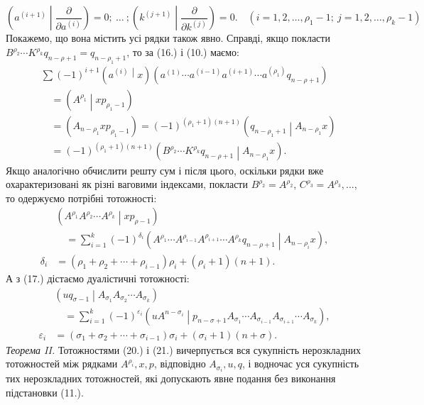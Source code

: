 \documentclass[11pt]{article}
\newcommand{\pair}[2]{\left(#1\middle|#2\right)}
\newcommand{\eps}{\varepsilon}
\begin{document}
\begin{equation}
 \left(a^{(i+1)}\middle|\frac{\partial}{\partial a^{(i)}}\right)=0;\ \ldots\ ;
 \left(k^{(j+1)}\middle|\frac{\partial}{\partial k^{(j)}}\right)=0.
 \quad (i=1,2,\ldots,\rho_1-1;\ j=1,2,\ldots,\rho_k-1)
\tag{19}
\end{equation}
Покажемо, що вона містить усі рядки також явно. Справді, якщо покласти $B^{\rho_2}\cdots K^{\rho_k}q_{n-\rho+1}=q_{n-\rho_1+1}$, то за (16.) і (10.) маємо:
\[
\begin{aligned}
&\sum(-1)^{i+1}\pair{a^{(i)}}{x}
(a^{(1)}\cdots a^{(i-1)}a^{(i+1)}\cdots a^{(\rho_1)}q_{n-\rho+1})\\
&\quad=\pair{A^{\rho_1}}{xp_{\rho_1-1}}\\
&\quad=(A_{n-\rho_1}xp_{\rho_1-1})
=(-1)^{(\rho_1+1)(n+1)}\pair{q_{n-\rho_1+1}}{A_{n-\rho_1}x}\\
&\quad=(-1)^{(\rho_1+1)(n+1)}
\pair{B^{\rho_2}\cdots K^{\rho_k}q_{n-\rho+1}}{A_{n-\rho_1}x}.
\end{aligned}
\]
Якщо аналогічно обчислити решту сум і після цього, оскільки рядки вже охарактеризовані як різні ваговими індексами, покласти $B^{\rho_2}=A^{\rho_2}$, $C^{\rho_3}=A^{\rho_3},\ldots$, то одержуємо потрібні тотожності:
\begin{equation}
\begin{aligned}
&\pair{A^{\rho_1}A^{\rho_2}\cdots A^{\rho_k}}{xp_{\rho-1}}\\
&\quad=\sum_{i=1}^{k}(-1)^{\delta_i}
\pair{A^{\rho_1}\cdots A^{\rho_{i-1}}A^{\rho_{i+1}}\cdots A^{\rho_k}q_{n-\rho+1}}{A_{n-\rho_i}x},\\
\delta_i&=(\rho_1+\rho_2+\cdots+\rho_{i-1})\rho_i+(\rho_i+1)(n+1).
\end{aligned}
\tag{20}
\end{equation}
А з (17.) дістаємо дуалістичні тотожності:
\begin{equation}
\begin{aligned}
&\pair{u q_{\sigma-1}}{A_{\sigma_1}A_{\sigma_2}\cdots A_{\sigma_k}}\\
&\quad=\sum_{i=1}^{k}(-1)^{\eps_i}
\pair{u A^{n-\sigma_i}}{p_{n-\sigma+1}A_{\sigma_1}\cdots A_{\sigma_{i-1}}A_{\sigma_{i+1}}\cdots A_{\sigma_k}},\\
\eps_i&=(\sigma_1+\sigma_2+\cdots+\sigma_{i-1})\sigma_i+(\sigma_i+1)(n+\sigma).
\end{aligned}
\tag{21}
\end{equation}
\emph{Теорема II.} Тотожностями (20.) і (21.) вичерпується вся сукупність нерозкладних тотожностей між рядками $A^{\rho_i},x,p$, відповідно $A_{\sigma_i},u,q$, і водночас уся сукупність тих нерозкладних тотожностей, які допускають явне подання без виконання підстановки (11.).
\end{document}
